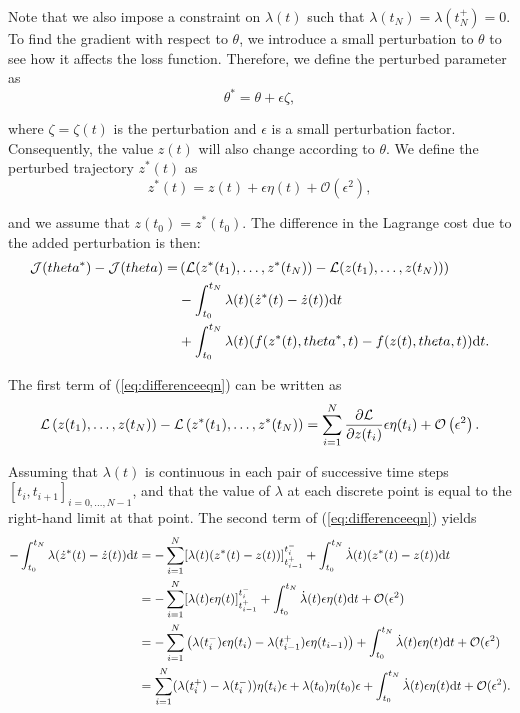 \documentclass[a4paper,11pt,titlepage]{article}
\theoremstyle{definition}
\theoremstyle{plain}
\theoremstyle{remark}
\begin{document}
Note that we also impose a constraint on $\lambda(t)$ such that $\lambda(t_N)=\lambda(t_N^+)=0$. To find the gradient with respect to $\theta$, we introduce a small perturbation to $\theta$ to see how it affects the loss function. Therefore, we define the perturbed parameter as
$$
\theta^*=\theta+\epsilon\zeta,
$$

where $\zeta=\zeta(t)$ is the perturbation and $\epsilon$ is a small perturbation factor. Consequently, the value $z(t)$ will also change according to $\theta$. We define the perturbed trajectory $z^*(t)$ as 
$$z^*(t)=z(t)+\epsilon\eta(t)+\mathcal{O}(\epsilon^2),$$

and we assume that $z(t_0)=z^*(t_0)$. The difference in the Lagrange cost due to the added perturbation is then:
\begin{align}
\mathcal{J}(\theta^*)-\mathcal{J}(\theta)=&\left(\mathcal{L}(z^*(t_1),\dots,z^*(t_{N}))-\mathcal{L}(z(t_1),\dots,z(t_{N}))\right)\notag\\
&-\int^{t_N}_{t_0}\lambda(t)(\dot{z}^*(t)-\dot{z}(t))\mathrm{d}t\notag\\
&+\int^{t_N}_{t_0}\lambda(t)(f(z^*(t),\theta^*,t)-f(z(t),\theta,t))\mathrm{d}t.
\label{eq:differenceeqn}
\end{align}

The first term of (\ref{eq:differenceeqn}) can be written as
$$
\mathcal{L}\left(z(t_1),\dots,z(t_{N})\right)-\mathcal{L}\left(z^*(t_1),\dots,z^*(t_{N})\right) = \sum^N_{i=1}\frac{\partial \mathcal{L}}{\partial z(t_i)}\epsilon\eta(t_i)+\mathcal{O}\left(\epsilon^2\right).\notag
$$

Assuming that $\lambda(t)$ is continuous in each pair of successive time steps $[t_i,t_{i+1}]_{i=0,\dots,N-1}$, and that the value of $\lambda$ at each discrete point is equal to the right-hand limit at that point. The second term of (\ref{eq:differenceeqn}) yields 
\begin{align}
-\int^{t_N}_{t_0}\lambda(\dot{z}^*(t)-\dot{z}(t))\mathrm{d}t&=-\sum^{N}_{i=1}[\lambda(t)(z^*(t)-z(t))]_{t_{i-1}^+}^{t_{i}^-}+\int^{t_N}_{t_0}\dot{\lambda}(t)(z^*(t)-z(t))\mathrm{d}t\notag\\
&=-\sum^{N}_{i=1}[\lambda(t)\epsilon\eta(t)]_{t_{i-1}^+}^{t_{i}^-}+\int^{t_N}_{t_0}\dot{\lambda}(t)\epsilon\eta(t)\mathrm{d}t+\mathcal{O}(\epsilon^2)\notag\\
&=-\sum^{N}_{i=1}\left(\lambda(t_i^-)\epsilon\eta(t_i)-\lambda(t_{i-1}^+)\epsilon\eta(t_{i-1})\right)+\int^{t_N}_{t_0}\dot{\lambda}(t)\epsilon\eta(t)\mathrm{d}t+\mathcal{O}(\epsilon^2)\notag\\
&=\sum^{N}_{i=1} (\lambda(t_i^+)-\lambda(t_i^-))\eta(t_i)\epsilon+\lambda(t_0)\eta(t_0)\epsilon+\int^{t_N}_{t_0}\dot{\lambda}(t)\epsilon\eta(t)\mathrm{d}t+\mathcal{O}(\epsilon^2).\notag
\end{align}
\end{document}
